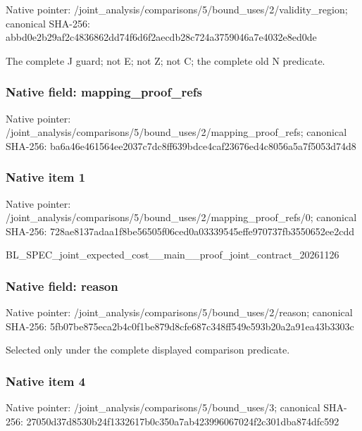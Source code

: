 \documentclass[10pt,a4paper]{article}
\begin{document}
Native pointer: /joint\_analysis/comparis\allowbreak{}ons/5/bound\_uses/2/valid\allowbreak{}ity\_region; canonical SHA-256: abbd0e2b29af2c4836862dd7\allowbreak{}4f6d6f2aecdb28c724a37590\allowbreak{}46a7e4032e8ed0de


The complete J guard; not E; not Z; not C; the complete old N predicate.


\subsubsection{Native field: mapping\_proof\_refs}


Native pointer: /joint\_analysis/comparis\allowbreak{}ons/5/bound\_uses/2/mappi\allowbreak{}ng\_proof\_refs; canonical SHA-256: ba6a46e461564ee2037c7dc8\allowbreak{}ff639bdce4caf23676ed4c80\allowbreak{}56a5a7f5053d74d8



\subsubsection{Native item 1}


Native pointer: /joint\_analysis/comparis\allowbreak{}ons/5/bound\_uses/2/mappi\allowbreak{}ng\_proof\_refs/0; canonical SHA-256: 728ae8137adaa1f8be56505f\allowbreak{}06ced0a03339545effe97073\allowbreak{}7fb3550652ee2cdd


BL\_SPEC\_joint\_expected\_c\allowbreak{}ost\_\_main\_\_proof\_joint\_c\allowbreak{}ontract\_20261126


\subsubsection{Native field: reason}


Native pointer: /joint\_analysis/comparis\allowbreak{}ons/5/bound\_uses/2/reaso\allowbreak{}n; canonical SHA-256: 5fb07be875eca2b4c0f1be87\allowbreak{}9d8cfe687c348ff549e593b2\allowbreak{}0a2a91ea43b3303c


Selected only under the complete displayed comparison predicate.


\subsubsection{Native item 4}


Native pointer: /joint\_analysis/comparis\allowbreak{}ons/5/bound\_uses/3; canonical SHA-256: 27050d37d8530b24f1332617\allowbreak{}b0c350a7ab423996067024f2\allowbreak{}c301dba874dfc592
\end{document}
